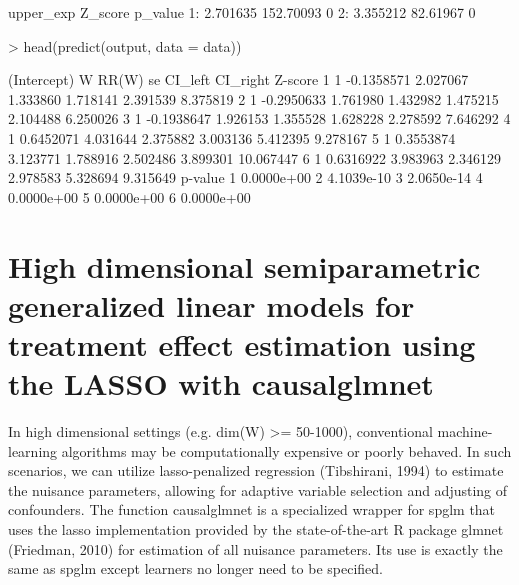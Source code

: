 \documentclass{article}
\begin{document}
\begin{Schunk}
\begin{Soutput}
   upper_exp   Z_score p_value
1:  2.701635 152.70093       0
2:  3.355212  82.61967       0
\end{Soutput}
\begin{Sinput}
> head(predict(output, data = data))
\end{Sinput}
\begin{Soutput}
  (Intercept)          W    RR(W)       se  CI_left CI_right   Z-score
1           1 -0.1358571 2.027067 1.333860 1.718141 2.391539  8.375819
2           1 -0.2950633 1.761980 1.432982 1.475215 2.104488  6.250026
3           1 -0.1938647 1.926153 1.355528 1.628228 2.278592  7.646292
4           1  0.6452071 4.031644 2.375882 3.003136 5.412395  9.278167
5           1  0.3553874 3.123771 1.788916 2.502486 3.899301 10.067447
6           1  0.6316922 3.983963 2.346129 2.978583 5.328694  9.315649
     p-value
1 0.0000e+00
2 4.1039e-10
3 2.0650e-14
4 0.0000e+00
5 0.0000e+00
6 0.0000e+00
\end{Soutput}
\end{Schunk}


\section{High dimensional semiparametric generalized linear models for treatment effect estimation using the LASSO with causalglmnet}
In high dimensional settings (e.g. dim(W) >= 50-1000), conventional machine-learning algorithms may be computationally expensive or poorly behaved. In such scenarios, we can utilize lasso-penalized regression (Tibshirani, 1994) to estimate the nuisance parameters, allowing for adaptive variable selection and adjusting of confounders. The function causalglmnet is a specialized wrapper for spglm that uses the lasso implementation provided by the state-of-the-art R package glmnet (Friedman, 2010) for estimation of all nuisance parameters.\nocite{Friedman2010}\nocite{Tibshirani94regressionshrinkage} Its use is exactly the same as spglm except learners no longer need to be specified.
\end{document}
